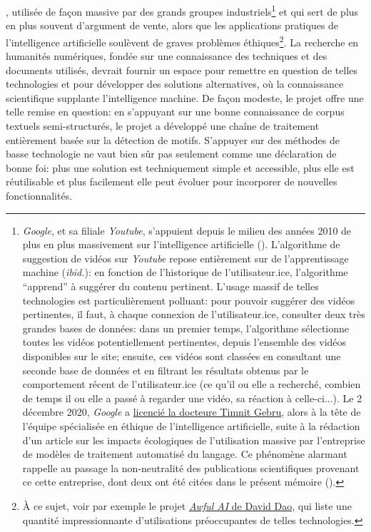 {}, utilisée de façon massive par des grands groupes industriels\footnote{
	\textit{Google}, et sa filiale \textit{Youtube}, s'appuient depuis le milieu des années 2010 de plus en plus massivement sur l'intelligence artificielle (\cite[p. 1]{covington_deep_2016}). L'algorithme de suggestion de vidéos sur \textit{Youtube} repose entièrement sur de l'apprentissage machine (\textit{ibid.}): en fonction de l'historique de l'utilisateur.ice, l'algorithme \enquote{apprend} à suggérer du contenu pertinent. L'usage massif de telles technologies est particulièrement polluant: pour pouvoir suggérer des vidéos pertinentes, il faut, à chaque connexion de l'utilisateur.ice, consulter deux très grandes bases de données: dans un premier temps, l'algorithme sélectionne toutes les vidéos potentiellement pertinentes, depuis l'ensemble des vidéos disponibles sur le site; ensuite, ces vidéos sont classées en consultant une seconde base de données et en filtrant les résultats obtenus par le comportement récent de l'utilisateur.ice (ce qu'il ou elle a recherché, combien de temps il ou elle a passé à regarder une vidéo, sa réaction à celle-ci...). Le 2 décembre 2020, \textit{Google} a \href{https://googlewalkout.medium.com/setting-the-record-straight-isupporttimnit-believeblackwomen-5d7bbfe4ed90}{licencié la docteure Timnit Gebru}, alors à la tête de l'équipe spécialisée en éthique de l'intelligence artificielle, suite à la rédaction d'un article sur les impacts écologiques de l'utilisation massive par l'entreprise de modèles de traitement automatisé du langage. Ce phénomène alarmant rappelle au passage la non-neutralité des publications scientifiques provenant ce cette entreprise, dont deux ont été citées dans le présent mémoire (\cite{mikolov_efficient_2013, covington_deep_2016}).
} et qui sert de plus en plus souvent d'argument de vente, alors que les applications pratiques de l'intelligence artificielle soulèvent de graves problèmes éthiques\footnote{
	À ce sujet, voir par exemple le projet \href{https://github.com/daviddao/awful-ai}{\textit{Awful AI} de David Dao}, qui liste une quantité impressionnante d'utilisations préoccupantes de telles technologies.
}. La recherche en humanités numériques, fondée sur une connaissance des techniques et des documents utilisés, devrait fournir un espace pour remettre en question de telles technologies et pour développer des solutions alternatives, où la connaissance scientifique supplante l'intelligence machine. De façon modeste, le projet \mssktb{} offre une telle remise en question: en s'appuyant sur une bonne connaissance de corpus textuels semi-structurés, le projet a développé une chaîne de traitement entièrement basée sur la détection de motifs. S'appuyer sur des méthodes de basse technologie ne vaut bien sûr pas seulement comme une déclaration de bonne foi: plus une solution est techniquement simple et accessible, plus elle est réutilisable et plus facilement elle peut évoluer pour incorporer de nouvelles fonctionnalités. 

